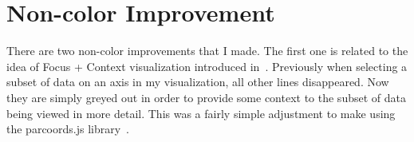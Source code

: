 \documentclass[12pt]{article}
\begin{document}
\section{Non-color Improvement}
There are two non-color improvements that I made.  The first one is related to the idea of Focus + Context visualization introduced in~\cite{Hauser}.  Previously when selecting a subset of data on an axis in my visualization, all other lines disappeared.  Now they are simply greyed out in order to provide some context to the subset of data being viewed in more detail.  This was a fairly simple adjustment to make using the parcoords.js library~\cite{Chang}.
\end{document}
